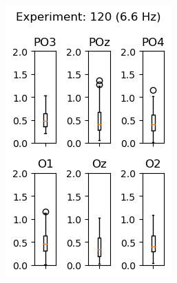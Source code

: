 \begin{figure}[ht]
    \centering
    \begin{subfigure}{0.25\linewidth}
        \includegraphics[width=\linewidth]{images/appendix/12066.png}
        \label{fig:12066}
    \end{subfigure}
    \begin{subfigure}{0.25\linewidth}

\end{subfigure}
\end{figure}
